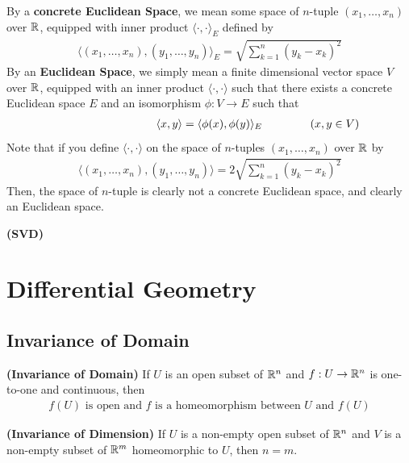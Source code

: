 \documentclass{report}
\begin{document}
\begin{mdframed}
  By a \textbf{concrete Euclidean Space}, we mean some space of $n$-tuple  $(x_1,\dots ,x_n)$ over $\mathbb{R}$, equipped with inner product  $\langle \cdot,\cdot\rangle_E$ defined by 
\begin{align*}
  \langle  (x_1,\dots,x_n)  ,(y_1,\dots ,y_n)\rangle_E= \sqrt{\sum_{k=1}^n (y_k-x_k)^2} 
\end{align*}
By an \textbf{Euclidean Space}, we simply mean a finite dimensional vector space $V$ over $\mathbb{R}$,  equipped with an inner product $\langle \cdot,\cdot\rangle $ such that there exists a concrete Euclidean space $E$ and an isomorphism  $\phi:V\to E$ such that 
\begin{align*}
\hspace{3cm}\langle x,y\rangle= \langle \phi (x),\phi (y)\rangle_E \hspace{1.5cm}(x,y \in V)
\end{align*}
Note that if you define $\langle \cdot,\cdot\rangle $ on the space of $n$-tuples $(x_1,\dots ,x_n)$ over $\mathbb{R}$ by 
\begin{align*}
  \langle  (x_1,\dots,x_n)  ,(y_1,\dots ,y_n)\rangle=2 \sqrt{\sum_{k=1}^n (y_k-x_k)^2} 
\end{align*}
Then, the space of $n$-tuple is clearly not a concrete Euclidean space, and clearly an Euclidean space. 

\end{mdframed}
\textbf{(SVD)}

\chapter{Differential Geometry}
\section{Invariance of Domain}
\begin{theorem}
\textbf{(Invariance of Domain)} If $U$ is an open subset of $\mathbb{R}^n$ and  $f:U\rightarrow \mathbb{R}^n$ is one-to-one and continuous, then 
\begin{align*}
f(U)\text{ is open and }f\text{ is a homeomorphism between }U\text{ and }f(U)
\end{align*}
\end{theorem}
\begin{theorem}
\textbf{(Invariance of Dimension)} If $U$ is a non-empty open subset of $\mathbb{R}^n$ and  $V$ is a non-empty subset of $\mathbb{R}^m$ homeomorphic to  $U$, then  $n=m$.
\end{theorem}
\end{document}
